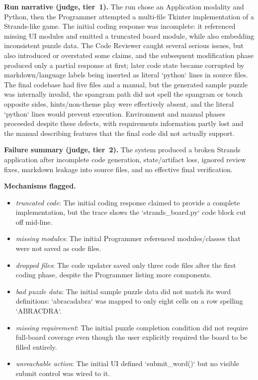 \textbf{Run narrative (judge, tier~1).} The run chose an Application modality and Python, then the Programmer attempted a multi-file Tkinter implementation of a Strands-like game. The initial coding response was incomplete: it referenced missing UI modules and emitted a truncated board module, while also embedding inconsistent puzzle data. The Code Reviewer caught several serious issues, but also introduced or overstated some claims, and the subsequent modification phase produced only a partial response at first; later code state became corrupted by markdown/language labels being inserted as literal `python` lines in source files. The final codebase had five files and a manual, but the generated sample puzzle was internally invalid, the spangram path did not spell the spangram or touch opposite sides, hints/non-theme play were effectively absent, and the literal `python` lines would prevent execution. Environment and manual phases proceeded despite these defects, with requirements information partly lost and the manual describing features that the final code did not actually support.

\textbf{Failure summary (judge, tier~2).} The system produced a broken Strands application after incomplete code generation, state/artifact loss, ignored review fixes, markdown leakage into source files, and no effective final verification.

\textbf{Mechanisms flagged.}
\begin{itemize}
  \item \emph{truncated code}: The initial coding response claimed to provide a complete implementation, but the trace shows the `strands\_board.py` code block cut off mid-line.
  \item \emph{missing modules}: The initial Programmer referenced modules/classes that were not saved as code files.
  \item \emph{dropped files}: The code updater saved only three code files after the first coding phase, despite the Programmer listing more components.
  \item \emph{bad puzzle data}: The initial sample puzzle data did not match its word definitions: `abracadabra` was mapped to only eight cells on a row spelling `ABRACDRA`.
  \item \emph{missing requirement}: The initial puzzle completion condition did not require full-board coverage even though the user explicitly required the board to be filled entirely.
  \item \emph{unreachable action}: The initial UI defined `submit\_word()` but no visible submit control was wired to it.
\end{itemize}

